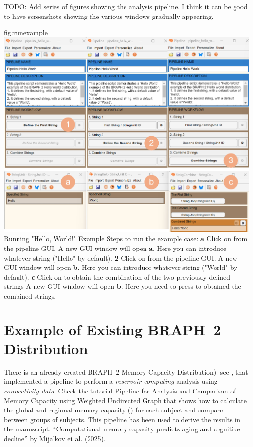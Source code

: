 \documentclass{tufte-handout}
\begin{document}

TODO: Add series of figures showing the analysis pipeline. I think it can be good to have screenshots showing the various windows gradually appearing.

	{fig:runexample}
	{\includegraphics{fig03.jpg}}
	{Running "Hello, World!" Example}
	{
	Steps to run the example case:
	{\bf a} Click on  from the pipeline GUI. A new GUI window will open {\bf a}. Here you can introduce whatever string ("Hello" by default).
	{\bf 2} Click on  from the pipeline GUI. A new GUI window will open {\bf b}. Here you can introduce whatever string ("World" by default).
	{\bf c} Click on  to obtain the combination of the two previously defined strings A new GUI window will open {\bf b}. Here you need to press   to obtained the combined strings. 
	}


\clearpage
\section{Example of Existing BRAPH~2 Distribution}

There is an already created \href{https://github.com/braph-software/MemoryCapacity}{BRAPH~2 Memory Capacity Distribution}), see , that implemented a pipeline to perform a \emph{reservoir computing} analysis using \emph{connectivity data}. Check the tutorial \href{https://github.com/braph-software/MemoryCapacity/tree/develop/tutorials/tut_mc_wu}{Pipeline for Analysis and Comparison of Memory Capacity using Weighted Undirected Graph
} that shows how to calculate the global and regional memory capacity () for each subject and compare between groups of subjects. This pipeline has been used to derive the results in the manuscript: “Computational memory capacity predicts aging and cognitive decline” by Mijalkov et al. (2025).
\end{document}
